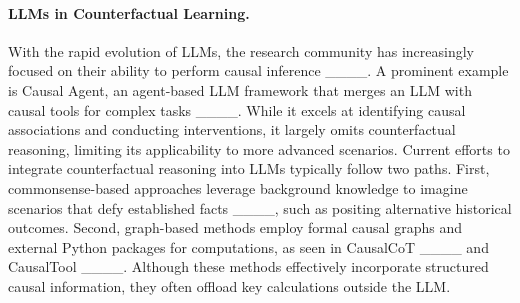 \paragraph{LLMs in Counterfactual Learning.}
With the rapid evolution of LLMs, the research community has increasingly focused on their ability to perform causal inference ____. A prominent example is Causal Agent, an agent-based LLM framework that merges an LLM with causal tools for complex tasks ____. While it excels at identifying causal associations and conducting interventions, it largely omits counterfactual reasoning, limiting its applicability to more advanced scenarios. Current efforts to integrate counterfactual reasoning into LLMs typically follow two paths. First, commonsense-based approaches leverage background knowledge to imagine scenarios that defy established facts ____, such as positing alternative historical outcomes. Second, graph-based methods employ formal causal graphs and external Python packages for computations, as seen in CausalCoT ____ and CausalTool ____. Although these methods effectively incorporate structured causal information, they often offload key calculations outside the LLM. %








